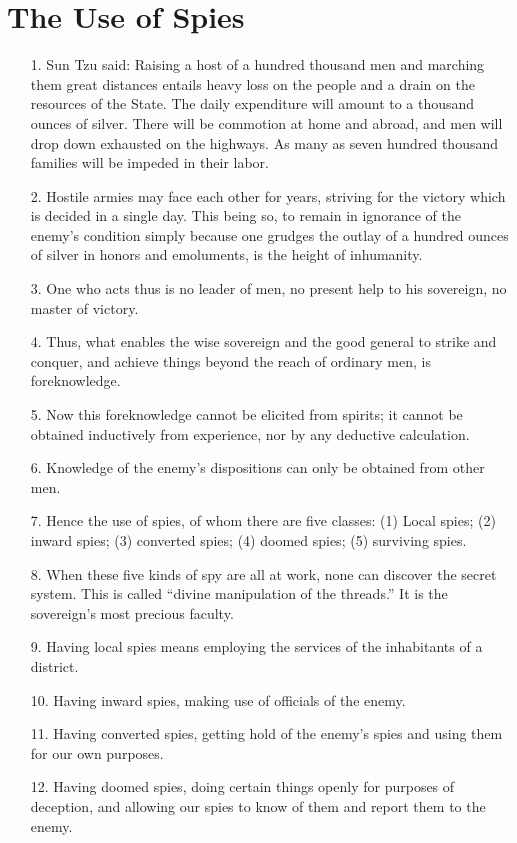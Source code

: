 \documentclass[11pt,openany]{memoir}
\newcommand{\enumeratemargin}{1.30em}
\begin{document}
\chapter{The Use of Spies}
\begin{enumerate}[leftmargin=\enumeratemargin]
\item[1.] Sun Tzu said: Raising a host of a hundred thousand men and marching them great distances entails heavy loss on the people and a drain on the resources of the State. The daily expenditure will amount to a thousand ounces of silver. There will be commotion at home and abroad, and men will drop down exhausted on the highways. As many as seven hundred thousand families will be impeded in their labor.
\item[2.] Hostile armies may face each other for years, striving for the victory which is decided in a single day. This being so, to remain in ignorance of the enemy's condition simply because one grudges the outlay of a hundred ounces of silver in honors and emoluments, is the height of inhumanity.
\item[3.] One who acts thus is no leader of men, no present help to his sovereign, no master of victory.
\item[4.] Thus, what enables the wise sovereign and the good general to strike and conquer, and achieve things beyond the reach of ordinary men, is foreknowledge.
\item[5.] Now this foreknowledge cannot be elicited from spirits; it cannot be obtained inductively from experience, nor by any deductive calculation.
\item[6.] Knowledge of the enemy's dispositions can only be obtained from other men.
\item[7.] Hence the use of spies, of whom there are five classes: (1) Local spies; (2) inward spies; (3) converted spies; (4) doomed spies; (5) surviving spies.
\item[8.] When these five kinds of spy are all at work, none can discover the secret system. This is called ``divine manipulation of the threads.'' It is the sovereign's most precious faculty.
\item[9.] Having local spies means employing the services of the inhabitants of a district.
\item[10.] Having inward spies, making use of officials of the enemy.
\item[11.] Having converted spies, getting hold of the enemy's spies and using them for our own purposes.
\item[12.] Having doomed spies, doing certain things openly for purposes of deception, and allowing our spies to know of them and report them to the enemy.

\end{enumerate}
\end{document}
